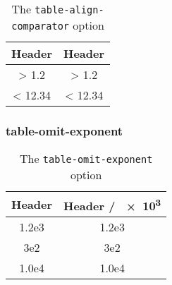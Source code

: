 \documentclass{article}
\begin{document}
\begin{table}[H]
\centering
\caption{The \texttt{table-align-comparator} option}
\label{tab:align:comp}
\begin{tabular}{SS[table-align-comparator = false]}
\toprule
{Header} & {Header} \\
\midrule
> 1.2 & > 1.2 \\
< 12.34 & < 12.34 \\
\bottomrule
\end{tabular}
\end{table}

\subsubsection{table-omit-exponent}
\begin{table}[H]
\centering
\caption{The \texttt{table-omit-exponent} option}
\label{tab:exp:omit}
\begin{tabular}{
S[table-format = 1.1e1]
S[fixed-exponent = 3, table-format = 2.1, table-omit-exponent]
}
\toprule
{Header} & {Header / \num{e3}} \\
\midrule
1.2e3 & 1.2e3 \\
3e2 & 3e2 \\
1.0e4 & 1.0e4 \\
\bottomrule
\end{tabular}
\end{table}
\end{document}
